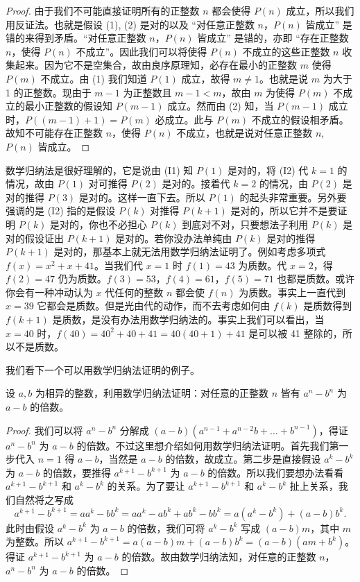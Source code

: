 \begin{proof}
由于我们不可能直接证明所有的正整数 $n$ 都会使得 $P(n)$ 成立，所以我们用反证法。也就是假设 (1), (2) 是对的以及 “对任意正整数 $n$，$P(n)$ 皆成立” 是错的来得到矛盾。“对任意正整数 $n$，$P(n)$ 皆成立” 是错的，亦即 “存在正整数 $n$，使得 $P(n)$ 不成立”。因此我们可以将使得 $P(n)$ 不成立的这些正整数 $n$ 收集起来。因为它不是空集合，故由良序原理知，必存在最小的正整数 $m$ 使得 $P(m)$ 不成立。由 (1) 我们知道 $P(1)$ 成立，故得 $m \neq 1$。也就是说 $m$ 为大于 1 的正整数。现由于 $m - 1$ 为正整数且 $m - 1 < m$，故由 $m$ 为使得 $P(m)$ 不成立的最小正整数的假设知 $P(m - 1)$ 成立。然而由 (2) 知，当 $P(m - 1)$ 成立时，$P((m - 1) + 1) = P(m)$ 必成立。此与 $P(m)$ 不成立的假设相矛盾。故知不可能存在正整数 $n$，使得 $P(n)$ 不成立，也就是说对任意正整数 $n$, $P(n)$ 皆成立。
\end{proof}

数学归纳法是很好理解的，它是说由 (I1) 知 $P(1)$ 是对的，将 (I2) 代 $k = 1$ 的情况，故由 $P(1)$ 对可推得 $P(2)$ 是对的。接着代 $k = 2$ 的情况，由 $P(2)$ 是对的推得 $P(3)$ 是对的。这样一直下去。所以 $P(1)$ 的起头非常重要。另外要强调的是 (I2) 指的是假设 $P(k)$ 对推得 $P(k + 1)$ 是对的，所以它并不是要证明 $P(k)$ 是对的，你也不必担心 $P(k)$ 到底对不对，只要想法子利用 $P(k)$ 是对的假设证出 $P(k + 1)$ 是对的。若你没办法单纯由 $P(k)$ 是对的推得 $P(k + 1)$ 是对的，那基本上就无法用数学归纳法证明了。例如考虑多项式 $f(x) = x^{2} + x + 41$。当我们代 $x = 1$ 时 $f(1) = 43$ 为质数。代 $x = 2$，得 $f(2) = 47$ 仍为质数。$f(3) = 53$，$f(4) = 61$，$f(5) = 71$ 也都是质数。或许你会有一种冲动认为 $x$ 代任何的整数 $n$ 都会使 $f(n)$ 为质数。事实上一直代到 $x = 39$ 它都会是质数。但是光由代的动作，而不去考虑如何由 $f(k)$ 是质数得到 $f(k + 1)$ 是质数，是没有办法用数学归纳法的。事实上我们可以看出，当 $x = 40$ 时，$f(40) = 40^{2} + 40 + 41 = 40(40 + 1) + 41$ 是可以被 41 整除的，所以不是质数。

我们看下一个可以用数学归纳法证明的例子。

\begin{example}
设 $a, b$ 为相异的整数，利用数学归纳法证明：对任意的正整数 $n$ 皆有 $a^{n} - b^{n}$ 为 $a - b$ 的倍数。
\end{example}

\begin{proof}
我们可以将 $a^{n} - b^{n}$ 分解成 $(a - b)(a^{n - 1} + a^{n - 2}b + \dots + b^{n - 1})$，得证 $a^{n} - b^{n}$ 为 $a - b$ 的倍数。不过这里想介绍如何用数学归纳法证明。首先我们第一步代入 $n = 1$ 得 $a - b$，当然是 $a - b$ 的倍数，故成立。第二步是直接假设 $a^{k} - b^{k}$ 为 $a - b$ 的倍数，要推得 $a^{k + 1} - b^{k + 1}$ 为 $a - b$ 的倍数。所以我们要想办法看看 $a^{k + 1} - b^{k + 1}$ 和 $a^{k} - b^{k}$ 的关系。为了要让 $a^{k + 1} - b^{k + 1}$ 和 $a^{k} - b^{k}$ 扯上关系，我们自然将之写成
$$a^{k + 1} - b^{k + 1} = a a^{k} - b b^{k} = a a^{k} - a b^{k} + a b^{k} - b b^{k} = a(a^{k} - b^{k}) + (a - b)b^{k}.$$
此时由假设 $a^{k} - b^{k}$ 为 $a - b$ 的倍数，我们可将 $a^{k} - b^{k}$ 写成 $(a - b)m$，其中 $m$ 为整数。所以 $a^{k + 1} - b^{k + 1} = a(a - b)m + (a - b)b^{k} = (a - b)(am + b^{k})$。得证 $a^{k + 1} - b^{k + 1}$ 为 $a - b$ 的倍数。故由数学归纳法知，对任意的正整数 $n$，$a^{n} - b^{n}$ 为 $a - b$ 的倍数。
\end{proof}

